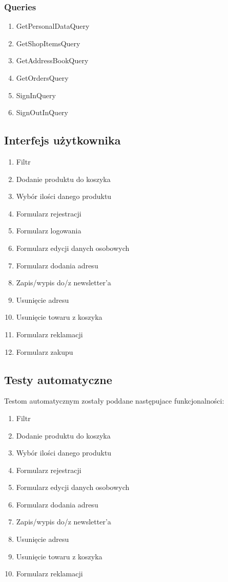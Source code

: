 \documentclass[10pt]{report}
\begin{document}
	
\subsubsection{Queries}
\begin{enumerate}
	\item GetPersonalDataQuery
	\item GetShopItemsQuery
	\item GetAddressBookQuery
	\item GetOrdersQuery
	\item SignInQuery
	\item SignOutInQuery
\end{enumerate}	



\subsection{Interfejs użytkownika}

\begin{enumerate}
	\item Filtr
	\item Dodanie produktu do koszyka
	\item Wybór ilości danego produktu
	\item Formularz rejestracji
	\item Formularz logowania
	\item Formularz edycji danych osobowych
	\item Formularz dodania adresu
	\item Zapis/wypis do/z newsletter'a
	\item Usunięcie adresu
	\item Usunięcie towaru z koszyka
	\item Formularz reklamacji
	\item Formularz zakupu
	
\end{enumerate} 

\subsection{Testy automatyczne}
Testom automatycznym zostały poddane następujace funkcjonalności:
\begin{enumerate}
	\item Filtr
	\item Dodanie produktu do koszyka
	\item Wybór ilości danego produktu
	\item Formularz rejestracji
	\item Formularz edycji danych osobowych
	\item Formularz dodania adresu
	\item Zapis/wypis do/z newsletter'a
	\item Usunięcie adresu
	\item Usunięcie towaru z koszyka
	\item Formularz reklamacji
	
\end{enumerate} 
\end{document}
